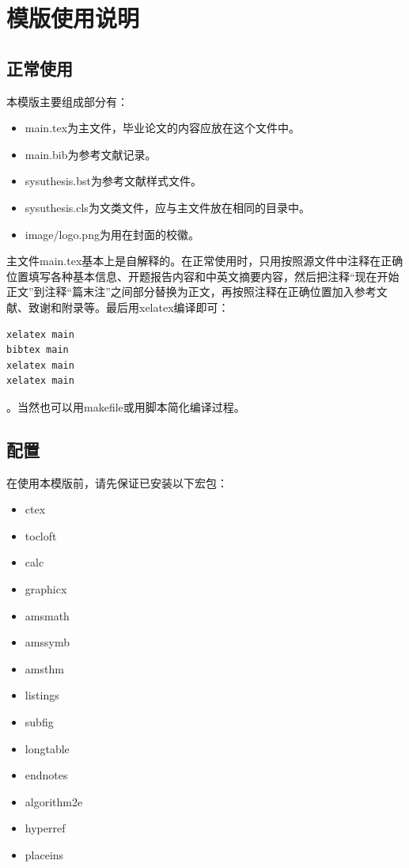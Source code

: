 ﻿\documentclass{sysuthesis}
\begin{document}
\chapter{模版使用说明}

\section{正常使用}

本模版主要组成部分有：

\begin{itemize}
\item {\ttfamily main.tex}为主文件，毕业论文的内容应放在这个文件中。
\item {\ttfamily main.bib}为参考文献记录。
\item {\ttfamily sysuthesis.bst}为参考文献样式文件。
\item {\ttfamily sysuthesis.cls}为文类文件，应与主文件放在相同的目录中。
\item {\ttfamily image/logo.png}为用在封面的校徽。
\end{itemize}

主文件{\ttfamily main.tex}基本上是自解释的。在正常使用时，只用按照源文件中注释在正确位置填写各种基本信息、开题报告内容和中英文摘要内容，然后把注释``现在开始正文''到注释``篇末注''之间部分替换为正文，再按照注释在正确位置加入参考文献、致谢和附录等。最后用{\ttfamily xelatex}编译即可：

\begin{lstlisting}[language=bash, keywordstyle=\color{blue}\bfseries, basicstyle=\ttfamily, breaklines=true, frame=shadowbox]
xelatex main
bibtex main
xelatex main
xelatex main
\end{lstlisting}
。当然也可以用{\ttfamily makefile}或用脚本简化编译过程。

\section{配置}

在使用本模版前，请先保证已安装以下宏包：

\begin{itemize}
\item {\ttfamily ctex}
\item {\ttfamily tocloft}
\item {\ttfamily calc}
\item {\ttfamily graphicx}
\item {\ttfamily amsmath}
\item {\ttfamily amssymb}
\item {\ttfamily amsthm}
\item {\ttfamily listings}
\item {\ttfamily subfig}
\item {\ttfamily longtable}
\item {\ttfamily endnotes}
\item {\ttfamily algorithm2e}
\item {\ttfamily hyperref}
\item {\ttfamily placeins}
\end{itemize}
\end{document}
